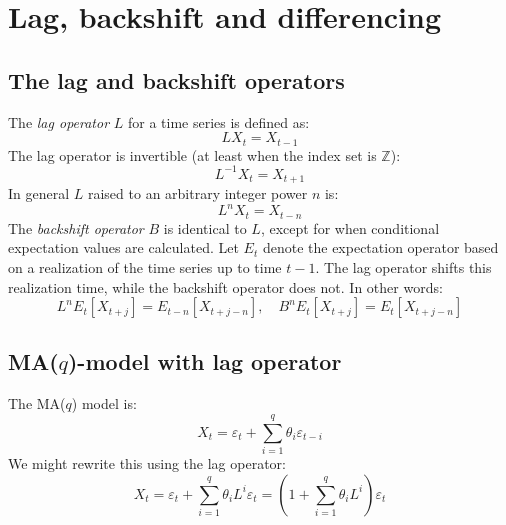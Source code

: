 \documentclass[12pt, a4paper]{article}
\numberwithin{equation}{section}
\begin{document}
\section{Lag, backshift and differencing}

\subsection{The lag and backshift operators}
The \textit{lag operator} $L$ for a time series is defined as:
\begin{equation}
LX_t=X_{t-1}
\end{equation}
The lag operator is invertible (at least when the index set is $\mathbb{Z}$):
\begin{equation}
L^{-1}X_t=X_{t+1}
\end{equation}
In general $L$ raised to an arbitrary integer power $n$ is:
\begin{equation}
L^n X_t=X_{t-n}
\end{equation}
The \textit{backshift operator} $B$ is identical to $L$, except for when conditional expectation values are calculated. Let $E_t$ denote the expectation operator based on a realization of the time series up to time $t-1$. The lag operator shifts this realization time, while the backshift operator does not. In other words:
\begin{equation}
L^n E_t[X_{t+j}]=E_{t-n}[X_{t+j-n}],\quad B^n E_t[X_{t+j}]=E_t[X_{t+j-n}]
\end{equation}

\subsection{MA($q$)-model with lag operator}
The MA($q$) model is:
\begin{equation}
X_t=\varepsilon_t+\sum_{i=1}^q\theta_i\varepsilon_{t-i}
\end{equation}
We might rewrite this using the lag operator:
\begin{equation}
X_t=\varepsilon_t+\sum_{i=1}^q\theta_i L^i\varepsilon_{t}=\left(1+\sum_{i=1}^q\theta_i L^i\right)\varepsilon_t
\end{equation}
\end{document}
